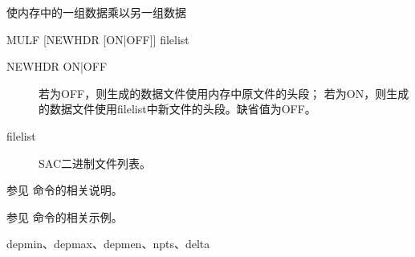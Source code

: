 \label{cmd:mulf}

使内存中的一组数据乘以另一组数据

\begin{SACSTX}
MULF [NEWHDR [ON|OFF]] filelist
\end{SACSTX}

\begin{description}
\item [NEWHDR ON|OFF] 若为OFF，则生成的数据文件使用内存中原文件的头段；
    若为ON，则生成的数据文件使用filelist中新文件的头段。缺省值为OFF。
\item [filelist] SAC二进制文件列表。
\end{description}

参见  命令的相关说明。

参见  命令的相关示例。

depmin、depmax、depmen、npts、delta
